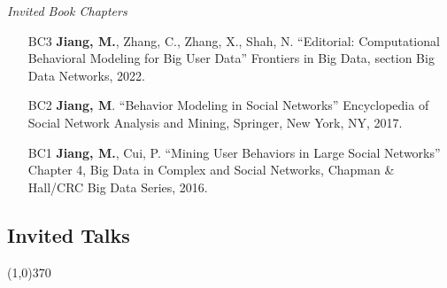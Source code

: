 \documentclass[10pt]{article}
\newenvironment{myindentpar}[1]%
{\begin{list}{}%
         {\setlength{\leftmargin}{#1}}%
         \item[]%
}
{\end{list}}
\newcounter{list}
\begin{document}
\begin{myindentpar}{0.00cm}
\begin{enumerate}[leftmargin=.5cm]
\end{enumerate}

\hspace{-0.25cm}\textit{Invited Book Chapters}

\begin{enumerate}[leftmargin=.5cm]

\item[BC3] \textbf{Jiang, M.}, Zhang, C., Zhang, X., Shah, N. ``Editorial: Computational Behavioral Modeling for Big User Data'' Frontiers in Big Data, section Big Data Networks, 2022.
		
\item[BC2] \textbf{Jiang, M}. ``Behavior Modeling in Social Networks'' Encyclopedia of Social Network Analysis and Mining, Springer, New York, NY, 2017.
		
\item[BC1] \textbf{Jiang, M.}, Cui, P. ``Mining User Behaviors in Large Social Networks'' Chapter 4, Big Data in Complex and Social Networks, Chapman \& Hall/CRC Big Data Series, 2016.

\end{enumerate}

\end{myindentpar}

\subsection{\sc Invited Talks}
\vspace{-0.4cm} \line(1,0){370} \vspace{-0.1cm}
\end{document}
